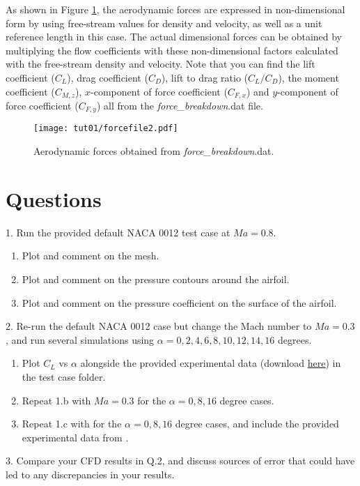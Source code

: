 As shown in Figure \ref{fig1:forcefile2}, the aerodynamic forces are expressed in non-dimensional form by using free-stream values for density and velocity, as well as a unit reference length in this case. The actual dimensional forces can be obtained by multiplying the flow coefficients with these non-dimensional factors calculated with the free-stream density and velocity. Note that you can find the lift coefficient ($C_L$), drag coefficient ($C_D$), lift to drag ratio ($C_L / C_D$), the moment coefficient ($C_{M,z}$), $x$-component of force coefficient ($C_{F,x}$) and $y$-component of force coefficient ($C_{F,y}$) all from the \textit{force\_breakdown}.dat file.
\begin{figure}[htbp]
    \centering
    \texttt{[image: tut01/forcefile2.pdf]}
    \caption{Aerodynamic forces obtained from \textit{force\_breakdown}.dat.}
    \label{fig1:forcefile2}
\end{figure}
\clearpage
\section{Questions}
1. Run the provided default NACA 0012 test case at $Ma=0.8$.
\begin{enumerate}[label=(\alph*)]
    \item Plot and comment on the mesh.
    \item Plot and comment on the pressure contours around the airfoil.
    \item Plot and comment on the pressure coefficient on the surface of the airfoil.
\end{enumerate}
2. Re-run the default NACA 0012 case but change the Mach number to $Ma=0.3$, and run several simulations using $\alpha = 0, 2, 4, 6, 8, 10, 12, 14, 16$ degrees.
\begin{enumerate}[label=(\alph*)]
    \item Plot $C_{L}$ vs $\alpha$ alongside the provided experimental data\cite{ladson1988effects} (download \href{https://gitlab.com/bvermeir/book-cfd/blob/master/tutorial/tut1_inviscid_NACA 0012/experimental_values.zip}{\underline{here}}) in the test case folder.
    \item Repeat 1.b with $Ma = 0.3$ for the $\alpha = 0, 8, 16$ degree cases.
    \item Repeat 1.c with for the $\alpha = 0, 8, 16$ degree cases, and include the provided experimental data from \cite{ladson1987pressure}.
\end{enumerate}
3. Compare your CFD results in Q.2, and discuss sources of error that could have led to any discrepancies in your results.
